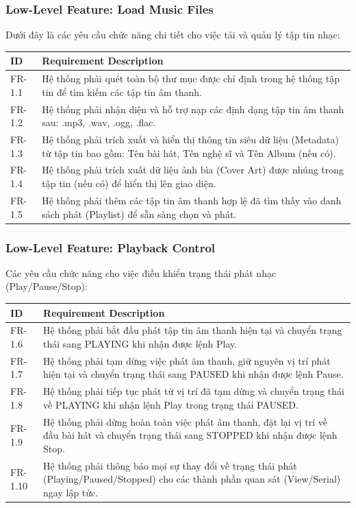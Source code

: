 \documentclass{article}
\begin{document}
\subsubsection{Low-Level Feature: Load Music Files}
Dưới đây là các yêu cầu chức năng chi tiết cho việc tải và quản lý tập tin nhạc:

\begin{center}
\renewcommand{\arraystretch}{1.5}
\begin{tabular}{|l|p{12cm}|}
\hline
\textbf{ID} & \textbf{Requirement Description} \\ \hline
FR-1.1 & Hệ thống phải quét toàn bộ thư mục được chỉ định trong hệ thống tập tin để tìm kiếm các tập tin âm thanh. \\ \hline
FR-1.2 & Hệ thống phải nhận diện và hỗ trợ nạp các định dạng tập tin âm thanh sau: .mp3, .wav, .ogg, .flac. \\ \hline
FR-1.3 & Hệ thống phải trích xuất và hiển thị thông tin siêu dữ liệu (Metadata) từ tập tin bao gồm: Tên bài hát, Tên nghệ sĩ và Tên Album (nếu có). \\ \hline
FR-1.4 & Hệ thống phải trích xuất dữ liệu ảnh bìa (Cover Art) được nhúng trong tập tin (nếu có) để hiển thị lên giao diện. \\ \hline
FR-1.5 & Hệ thống phải thêm các tập tin âm thanh hợp lệ đã tìm thấy vào danh sách phát (Playlist) để sẵn sàng chọn và phát. \\ \hline
\end{tabular}

\end{center}

\subsubsection{Low-Level Feature: Playback Control}
Các yêu cầu chức năng cho việc điều khiển trạng thái phát nhạc (Play/Pause/Stop):

\begin{center}
\renewcommand{\arraystretch}{1.5}
\begin{tabular}{|l|p{12cm}|}
\hline
\textbf{ID} & \textbf{Requirement Description} \\ \hline
FR-1.6 & Hệ thống phải bắt đầu phát tập tin âm thanh hiện tại và chuyển trạng thái sang PLAYING khi nhận được lệnh Play. \\ \hline
FR-1.7 & Hệ thống phải tạm dừng việc phát âm thanh, giữ nguyên vị trí phát hiện tại và chuyển trạng thái sang PAUSED khi nhận được lệnh Pause. \\ \hline
FR-1.8 & Hệ thống phải tiếp tục phát từ vị trí đã tạm dừng và chuyển trạng thái về PLAYING khi nhận lệnh Play trong trạng thái PAUSED. \\ \hline
FR-1.9 & Hệ thống phải dừng hoàn toàn việc phát âm thanh, đặt lại vị trí về đầu bài hát và chuyển trạng thái sang STOPPED khi nhận được lệnh Stop. \\ \hline
FR-1.10 & Hệ thống phải thông báo mọi sự thay đổi về trạng thái phát (Playing/Paused/Stopped) cho các thành phần quan sát (View/Serial) ngay lập tức. \\ \hline
\end{tabular}
\end{center}
\end{document}
